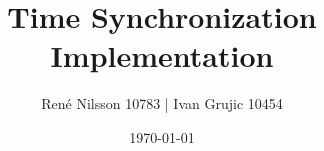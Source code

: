 \documentclass[10pt]{article}
\title{Time Synchronization Implementation}
\author{René Nilsson 10783 | Ivan Grujic 10454}
\date{\today}
\begin{document}
\maketitle



\listoffixmes
\newpage

\tableofcontents

\newpage



\newpage



\newpage






\newpage



\newpage






\newpage


\newpage
\appendix

\end{document}
